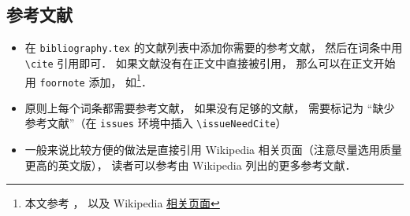 \subsection{参考文献}
\begin{itemize}
\item 在 \verb|bibliography.tex| 的文献列表中添加你需要的参考文献， 然后在词条中用 \verb|\cite| 引用即可． 如果文献没有在正文中直接被引用， 那么可以在正文开始用 \verb|foornote| 添加， 如\footnote{本文参考 \cite{GriffE}， \cite{GriffQ} 以及 Wikipedia \href{https://www.wikipedia.org/}{相关页面}}．
\item 原则上每个词条都需要参考文献， 如果没有足够的文献， 需要标记为 “缺少参考文献”（在 \verb|issues| 环境中插入 \verb|\issueNeedCite|）
\item 一般来说比较方便的做法是直接引用 Wikipedia 相关页面（注意尽量选用质量更高的英文版）， 读者可以参考由 Wikipedia 列出的更多参考文献．
\end{itemize}
